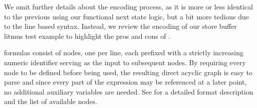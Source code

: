 We omit further details about the encoding process, as it is more or less identical to the previous using our functional next state logic, but a bit more tedious due to the line based syntax.
Instead, we review the encoding of our store buffer litmus test example to highlight the pros and cons of {\BTOR}.

{\BTOR} formulas consist of nodes, one per line, each prefixed with a strictly increasing numeric identifier serving as the input to subsequent nodes.
By requiring every node to be defined before being used, the resulting direct acyclic graph is easy to parse
and since every part of the expression may be referenced at a later point,
no additional auxiliary variables are needed.
See \cite{ref:BTOR2} for a detailed format description and the list of available nodes.

